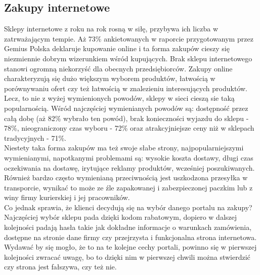 \documentclass[12pt]{article}
\begin{document}
\begin{sloppypar}
{  \subsection{Zakupy internetowe}
  {
    Sklepy internetowe z roku na rok rosną w siłę, przybywa ich liczba w zatrważającym tempie. 
    Aż 73\% ankietowanych w raporcie przygotowanym przez Gemius Polska\cite{gemius-report} deklaruje kupowanie online i ta forma zakupów cieszy się niezmiennie dobrym 
    wizerunkiem wśród kupujących. Brak sklepu internetowego stanowi ogromną niekorzyść dla obecnych przedsiębiorców. 
    Zakupy online charakteryzują się dużo większym wyborem produktów, łatwością w porównywaniu ofert czy też łatwością w znalezieniu interesujących produktów. 
    Lecz, to nie z wyżej wymienionych powodów, sklepy w sieci cieszą sie taką popularnością.
    Wśród najczęściej wymienianych powodów są: dostępność przez całą dobę (aż 82\% wybrało ten powód), brak konieczności wyjazdu do sklepu - 78\%, 
    nieograniczony czas wyboru - 72\% oraz atrakcyjniejsze ceny niż w sklepach tradycyjnych - 71\%.\\
    Niestety taka forma zakupów ma też swoje słabe strony, najpopularniejszymi
    wymienianymi, napotkanymi problemami są: wysokie koszta dostawy, długi czas oczekiwania na dostawę, irytujące reklamy produktów, wcześniej poszukiwanych.
    Również bardzo często wymienianą przeciwnością jest uszkodzona przesyłka w transporcie, wynikać to może ze źle zapakowanej i zabezpieczonej paczkim lub z winy 
    firmy kurierskiej i jej pracowników.\\
    Co jednak sprawia, że klienci decydują się na wybór danego portalu na zakupy?\\
    Najczęściej wybór sklepu pada dzięki kodom rabatowym, dopiero w dalszej kolejności padają hasła takie jak dokładne informacje o warunkach zamówienia,
    dostępne na stronie dane firmy czy przejrzysta i funkcjonalna strona internetowa. Wydawać by się mogło, że to na te kolejne cechy portali, powinno się w pierwszej kolejności
    zwracać uwagę, bo to dzięki nim w pierwszej chwili można stwierdzić czy strona jest fałszywa, czy też nie.
  }
}
\end{sloppypar}
\end{document}
